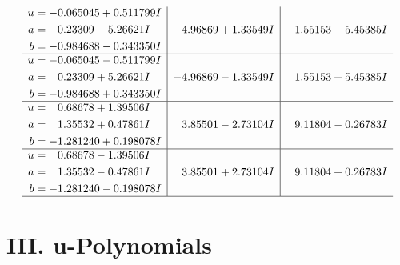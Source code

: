 \documentclass[1p]{elsarticle_modified}
\theoremstyle{definition}
\begin{document}
$$\begin{array}{c|c|c}
\begin{aligned}
u &= -0.065045 + 0.511799 I \\
a &= \phantom{-}0.23309 - 5.26621 I \\
b &= -0.984688 - 0.343350 I\end{aligned}
 & -4.96869 + 1.33549 I & \phantom{-}1.55153 - 5.45385 I \\ \hline\begin{aligned}
u &= -0.065045 - 0.511799 I \\
a &= \phantom{-}0.23309 + 5.26621 I \\
b &= -0.984688 + 0.343350 I\end{aligned}
 & -4.96869 - 1.33549 I & \phantom{-}1.55153 + 5.45385 I \\ \hline\begin{aligned}
u &= \phantom{-}0.68678 + 1.39506 I \\
a &= \phantom{-}1.35532 + 0.47861 I \\
b &= -1.281240 + 0.198078 I\end{aligned}
 & \phantom{-}3.85501 - 2.73104 I & \phantom{-}9.11804 - 0.26783 I \\ \hline\begin{aligned}
u &= \phantom{-}0.68678 - 1.39506 I \\
a &= \phantom{-}1.35532 - 0.47861 I \\
b &= -1.281240 - 0.198078 I\end{aligned}
 & \phantom{-}3.85501 + 2.73104 I & \phantom{-}9.11804 + 0.26783 I\\
 \hline 
 \end{array}$$\newpage
\newpage\renewcommand{\arraystretch}{1}
\centering \section*{ III. u-Polynomials}
\end{document}
